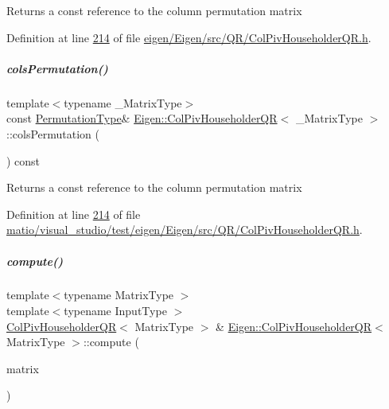 \begin{DoxyReturn}{Returns}
a const reference to the column permutation matrix 
\end{DoxyReturn}


Definition at line \hyperlink{eigen_2_eigen_2src_2_q_r_2_col_piv_householder_q_r_8h_source_l00214}{214} of file \hyperlink{eigen_2_eigen_2src_2_q_r_2_col_piv_householder_q_r_8h_source}{eigen/\+Eigen/src/\+Q\+R/\+Col\+Piv\+Householder\+Q\+R.\+h}.

\mbox{\label{group___q_r___module_ab6ad43e6a6fb75726eae0d5499948f4a}} 
\subparagraph{\texorpdfstring{cols\+Permutation()}{colsPermutation()}\hspace{0.1cm}{\footnotesize\ttfamily [2/2]}}
{\footnotesize\ttfamily template$<$typename \+\_\+\+Matrix\+Type$>$ \\
const \hyperlink{group___core___module}{Permutation\+Type}\& \hyperlink{group___q_r___module_class_eigen_1_1_col_piv_householder_q_r}{Eigen\+::\+Col\+Piv\+Householder\+QR}$<$ \+\_\+\+Matrix\+Type $>$\+::cols\+Permutation (\begin{DoxyParamCaption}{ }\end{DoxyParamCaption}) const\hspace{0.3cm}{\ttfamily [inline]}}

\begin{DoxyReturn}{Returns}
a const reference to the column permutation matrix 
\end{DoxyReturn}


Definition at line \hyperlink{matio_2visual__studio_2test_2eigen_2_eigen_2src_2_q_r_2_col_piv_householder_q_r_8h_source_l00214}{214} of file \hyperlink{matio_2visual__studio_2test_2eigen_2_eigen_2src_2_q_r_2_col_piv_householder_q_r_8h_source}{matio/visual\+\_\+studio/test/eigen/\+Eigen/src/\+Q\+R/\+Col\+Piv\+Householder\+Q\+R.\+h}.

\mbox{\label{group___q_r___module_a768c98c092250c9e319c3298b05f0f2d}} 
\subparagraph{\texorpdfstring{compute()}{compute()}}
{\footnotesize\ttfamily template$<$typename Matrix\+Type $>$ \\
template$<$typename Input\+Type $>$ \\
\hyperlink{group___q_r___module_class_eigen_1_1_col_piv_householder_q_r}{Col\+Piv\+Householder\+QR}$<$ Matrix\+Type $>$ \& \hyperlink{group___q_r___module_class_eigen_1_1_col_piv_householder_q_r}{Eigen\+::\+Col\+Piv\+Householder\+QR}$<$ Matrix\+Type $>$\+::compute (\begin{DoxyParamCaption}\item[{const \hyperlink{group___core___module_struct_eigen_1_1_eigen_base}{Eigen\+Base}$<$ Input\+Type $>$ \&}]{matrix }\end{DoxyParamCaption})}

